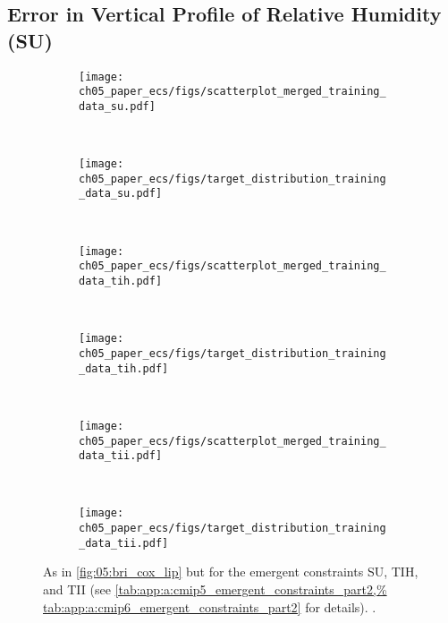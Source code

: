 \subsection{Error in Vertical Profile of Relative Humidity (SU)}
\label{subsec:05:su}

\begin{figure}[!t]
  \centering
  \begin{subfigure}[b]{\SubfigureWidth{}}
    \texttt{[image: 
      ch05\_paper\_ecs/figs/scatterplot\_merged\_training\_data\_su.pdf]}
    \caption{}
    \label{fig:05:su_tih_tii:a}
  \end{subfigure}
  ~
  \begin{subfigure}[b]{\SubfigureWidth{}}
    \texttt{[image: 
      ch05\_paper\_ecs/figs/target\_distribution\_training\_data\_su.pdf]}
    \caption{}
    \label{fig:05:su_tih_tii:b}
  \end{subfigure}
  \\
  \begin{subfigure}[b]{\SubfigureWidth{}}
    \texttt{[image: 
      ch05\_paper\_ecs/figs/scatterplot\_merged\_training\_data\_tih.pdf]}
    \caption{}
    \label{fig:05:su_tih_tii:c}
  \end{subfigure}
  ~
  \begin{subfigure}[b]{\SubfigureWidth{}}
    \texttt{[image: 
      ch05\_paper\_ecs/figs/target\_distribution\_training\_data\_tih.pdf]}
    \caption{}
    \label{fig:05:su_tih_tii:d}
  \end{subfigure}
  \\
  \begin{subfigure}[b]{\SubfigureWidth{}}
    \texttt{[image: 
      ch05\_paper\_ecs/figs/scatterplot\_merged\_training\_data\_tii.pdf]}
    \caption{}
    \label{fig:05:su_tih_tii:e}
  \end{subfigure}
  ~
  \begin{subfigure}[b]{\SubfigureWidth{}}
    \texttt{[image: 
      ch05\_paper\_ecs/figs/target\_distribution\_training\_data\_tii.pdf]}
    \caption{}
    \label{fig:05:su_tih_tii:f}
  \end{subfigure}
  \caption[
    As in \cref{fig:05:bri_cox_lip} but for the emergent constraints SU, TIH,
    and TII.
  ]{
    As in \cref{fig:05:bri_cox_lip} but for the emergent constraints SU, TIH,
    and TII (see \cref{tab:app:a:cmip5_emergent_constraints_part2,%
      tab:app:a:cmip6_emergent_constraints_part2} for details).
    .
  }
  \label{fig:05:su_tih_tii}
\end{figure}

